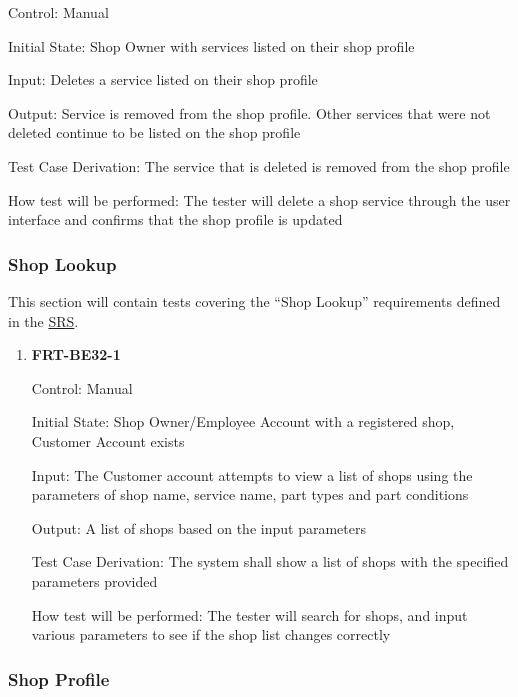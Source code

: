\documentclass[12pt, titlepage]{article}
\begin{document}
\begin{enumerate}
	      Control: Manual

	      Initial State: Shop Owner with services listed on their shop profile

	      Input: Deletes a service listed on their shop profile

	      Output: Service is removed from the shop profile. Other services that were not deleted continue to
	      be listed on the shop profile

	      Test Case Derivation: The service that is deleted is removed from the shop profile

	      How test will be performed: The tester will delete a shop service through the user interface and
	      confirms that the shop profile is updated

\end{enumerate}

\subsubsection{Shop Lookup}

This section will contain tests covering the ``Shop Lookup'' requirements defined in the
\href{https://github.com/arkinmodi/project-sayyara/blob/main/docs/SRS/SRS.pdf}{SRS}.

\begin{enumerate}
	\item \textbf{FRT-BE32-1}

	      Control: Manual

	      Initial State: Shop Owner/Employee Account with a registered shop, Customer Account exists

	      Input: The Customer account attempts to view a list of shops using the parameters of shop name,
	      service name, part types and part conditions

	      Output: A list of shops based on the input parameters

	      Test Case Derivation: The system shall show a list of shops with the specified parameters provided

	      How test will be performed: The tester will search for shops, and input various parameters to see
	      if the shop list changes correctly
\end{enumerate}

\subsubsection{Shop Profile}
\end{document}
